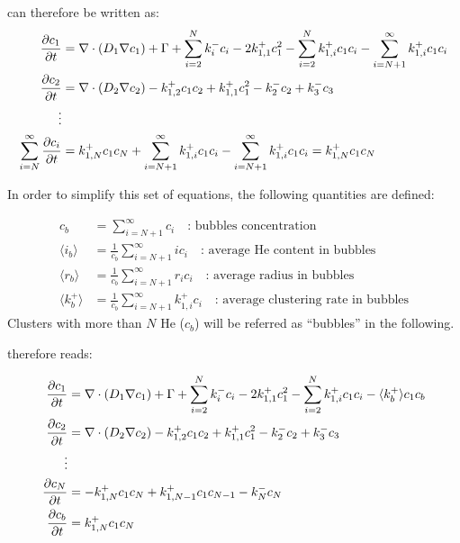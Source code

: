  can therefore be written as:
\begin{subequations}
    \begin{align}
        \frac{\partial c_1}{\partial t} &= \nabla \cdot (D_1 \nabla c_1) + \Gamma + \sum\limits_{i=2}^N k_{i}^- c_i - 2k_{1, 1}^+ c_1^2 - \sum\limits_{i=2}^N k_{1,i}^+ c_1 c_i - \sum\limits_{i=N+1}^\infty k_{1,i}^+ c_1 c_i \\
        \frac{\partial c_2}{\partial t} &= \nabla \cdot (D_2 \nabla c_2) - k_{1, 2}^+ c_1 c_2 + k_{1, 1}^+ c_1^2 - k_{2}^- c_2 + k_{3}^- c_3\\
        \vdots \nonumber\\
        \sum\limits_{i=N}^\infty \frac{\partial c_{i}}{\partial t} &= k_{1, N}^+ c_1 c_N + \sum\limits_{i=N+1}^\infty k_{1, i}^+ c_1 c_i - \sum\limits_{i=N+1}^\infty k_{1, i}^+ c_1 c_i = k_{1, N}^+ c_1 c_N
    \end{align}
    \labeq{temporal evolution grouping no new symbols}
\end{subequations}

In order to simplify this set of equations, the following quantities are defined:

\begin{align}
    c_b &= \sum\limits_{i=N+1}^\infty c_i \quad \text{: bubbles concentration} \\
    \langle i_b \rangle &= \frac{1}{c_b} \sum\limits_{i=N+1}^\infty i c_i \quad \text{: average He content in bubbles} \\
    \langle r_b \rangle &=  \frac{1}{c_b}\sum\limits_{i=N+1}^\infty r_i c_i \quad \text{: average radius in bubbles}\\
    \langle k_b^+ \rangle &=  \frac{1}{c_b}\sum\limits_{i=N+1}^\infty k_{1,i}^+ c_i \quad \text{: average clustering rate in bubbles}
\end{align}
Clusters with more than $N$ \gls{He} ($c_b$) will be referred as ``bubbles'' in the following.

 therefore reads:

\begin{subequations}
    \begin{align}
        \frac{\partial c_1}{\partial t} &= \nabla \cdot (D_1 \nabla c_1) + \Gamma + \sum\limits_{i=2}^N k_{i}^- c_i- 2k_{1, 1}^+ c_1^2 - \sum\limits_{i=2}^N k_{1,i}^+ c_1 c_i - \langle k_b^+ \rangle c_1 c_b \\
        \frac{\partial c_2}{\partial t} &= \nabla \cdot (D_2 \nabla c_2) - k_{1, 2}^+ c_1 c_2 + k_{1, 1}^+ c_1^2 - k_{2}^- c_2 + k_{3}^- c_3\\
        \vdots \nonumber\\
        \frac{\partial c_N}{\partial t} &= - k_{1, N}^+ c_1 c_N + k_{1, N-1}^+ c_1 c_{N-1} - k_{N}^- c_N\\
        \frac{\partial c_b}{\partial t} &= k_ {1,N}^+ c_1 c_N \\
    \end{align}
    \labeq{temporal evolution grouping}
\end{subequations}

